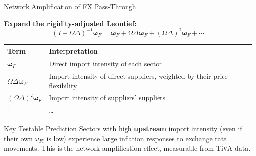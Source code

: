 \documentclass[aspectratio=169]{beamer}
\begin{document}
\begin{frame}{Network Amplification of FX Pass-Through}

\textbf{Expand the rigidity-adjusted Leontief:}
\begin{equation*}
    (I-\Omega\Delta)^{-1}\bm{\omega}_F = \bm{\omega}_F + \Omega\Delta\bm{\omega}_F + (\Omega\Delta)^2\bm{\omega}_F + \cdots
\end{equation*}

\begin{center}
\small
\begin{tabular}{ll}
\toprule
\textbf{Term} & \textbf{Interpretation} \\
\midrule
$\bm{\omega}_F$ & Direct import intensity of each sector \\
$\Omega\Delta\bm{\omega}_F$ & Import intensity of direct suppliers, weighted by their price flexibility \\
$(\Omega\Delta)^2\bm{\omega}_F$ & Import intensity of suppliers' suppliers \\
$\vdots$ & \ldots \\
\bottomrule
\end{tabular}
\end{center}

\vspace{0.3cm}
\begin{alertblock}{Key Testable Prediction}
Sectors with high \textbf{upstream} import intensity (even if their own $\omega_{Fi}$ is low) experience large inflation responses to exchange rate movements. This is the network amplification effect, measurable from TiVA data.
\end{alertblock}
\end{frame}
\end{document}
